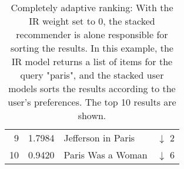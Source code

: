 \begin{table}[t]
\begin{minipage}{0.49\textwidth}
\begin{tabular*}{\textwidth}{ r l l l }
    9 & 1.7984 &  Jefferson in Paris          & \color{red} $\downarrow$ 2 \\
    10& 0.9420 &  Paris Was a Woman           & \color{red} $\downarrow$ 6 \\
    \bottomrule
  \end{tabular*}
  \end{minipage} 
  \vspace{1em}
  \caption[Completely Adaptive Ranking]{
    Completely adaptive ranking: With the IR weight set to $0$,
    the stacked recommender is alone responsible for sorting the results.
    In this example, the IR model returns a list of items for the query "paris",
    and the stacked user models sorts the results according to the user's preferences.
    The top 10 results are shown.
  }
  \label{table:rank:paris}
\end{table}


